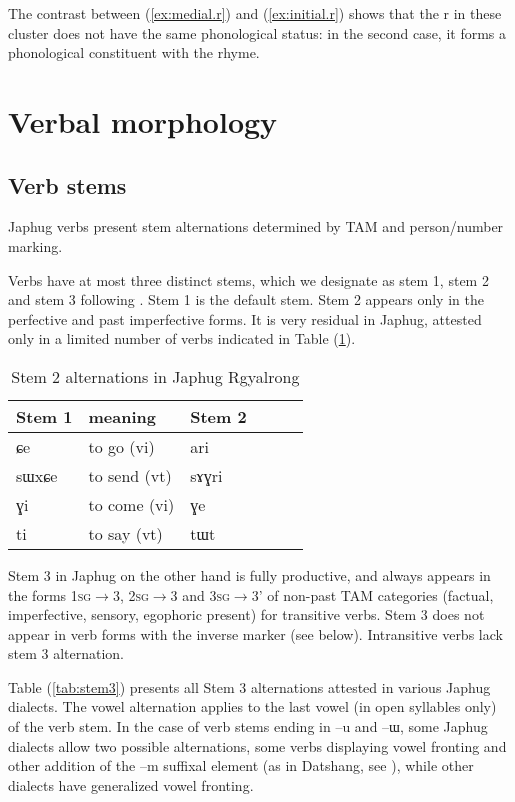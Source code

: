 \documentclass[oldfontcommands,oneside,a4paper,11pt]{article}
\newcommand{\ipa}[1]{{\phon#1}} %
\newcommand{\refb}[1]{(\ref{#1})}
\begin{document}
The contrast between \refb{ex:medial.r} and \refb{ex:initial.r} shows that the \ipa{r} in these cluster does not have the same phonological status: in the second case, it forms a phonological constituent with the rhyme.



\section{Verbal morphology}

\subsection{Verb stems}

Japhug verbs present stem alternations determined by TAM and person/number marking. 

Verbs have at most three distinct stems, which we designate as stem 1, stem 2 and stem 3 following \citet{jackson00sidaba}. Stem 1 is the default stem. Stem 2 appears only in the perfective and past imperfective forms. It is very residual in Japhug, attested only in a limited number of verbs indicated in Table \refb{tab:stem2}.


 \begin{table} 
\caption{Stem 2 alternations in Japhug Rgyalrong} \label{tab:stem2} \centering
\begin{tabular}{llllll}
\toprule
Stem 1 & meaning &Stem 2 \\
\midrule
\ipa{ɕe}& to go (vi)&  \ipa{ari} \\
\ipa{sɯxɕe}& to send (vt)  &\ipa{sɤɣri} \\
\ipa{ɣi}& to come (vi)  &\ipa{ɣe} \\
\ipa{ti}& to say (vt)  &\ipa{tɯt} \\
\bottomrule
\end{tabular}
\end{table}

Stem 3 in Japhug on the other hand is fully productive, and always appears in the forms \textsc{1sg}$\rightarrow$3, \textsc{2sg}$\rightarrow$3 and \textsc{3sg}$\rightarrow$3' of non-past TAM categories (factual, imperfective, sensory, egophoric present) for transitive verbs. Stem 3 does not appear in verb forms with the inverse marker (see below). Intransitive verbs lack stem 3 alternation.

Table \refb{tab:stem3} presents all Stem 3 alternations attested in various Japhug dialects. The vowel alternation applies to the last vowel (in open syllables only) of the verb stem. In the case of verb stems ending in  \ipa{--u} and  \ipa{--ɯ}, some Japhug dialects allow two possible alternations, some verbs displaying vowel fronting and other addition of the \ipa{--m} suffixal element (as in Datshang, see \citealt{linluo03}), while other dialects have generalized vowel fronting.
\end{document}
